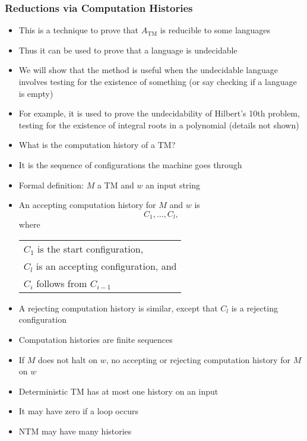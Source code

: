 




\begin{frame}[allowframebreaks] \frametitle{Reductions via Computation Histories}
\begin{itemize}
\item This is a technique to prove that $A_{\text{TM}}$ is reducible to
  some languages
\item Thus it can be used to prove that a language is undecidable
\item We will show that the method is useful when the
  undecidable language involves testing for the
  existence of something (or say checking if a language
  is empty)
\item For example, it is used to prove the undecidability of
  Hilbert's 10th problem, testing for the existence of integral roots
  in a polynomial (details not shown)
\item What is the computation history of a TM?
\item It is the sequence of configurations the machine goes
  through
\item Formal definition: $M$ a TM and $w$ an input string
\item [] An accepting computation history for $M$ and $w$ is
  \begin{equation*}
    C_1, \ldots, C_l,
  \end{equation*}
where
\begin{center}
  \begin{tabular}{l}
    $C_1$  is the start configuration,\\
    $C_l$ is an accepting configuration, and\\
    $C_i$ follows from $C_{i-1}$
  \end{tabular}
\end{center}
\item A rejecting computation history is similar,
  except that $C_l$ is a rejecting configuration
\item Computation histories are finite sequences
\item[] If $M$ does not halt on $w$, no accepting or
  rejecting computation history for $M$ on $w$
\item Deterministic TM has at most one history on an input
\item [] It may have zero if a loop occurs
\item NTM may have many histories
  \end{itemize}\end{frame}
